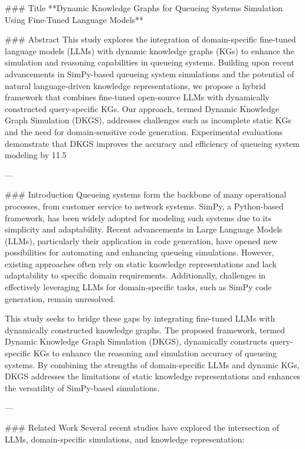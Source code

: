 ### Title  
**Dynamic Knowledge Graphs for Queueing Systems Simulation Using Fine-Tuned Language Models**

### Abstract  
This study explores the integration of domain-specific fine-tuned language models (LLMs) with dynamic knowledge graphs (KGs) to enhance the simulation and reasoning capabilities in queueing systems. Building upon recent advancements in SimPy-based queueing system simulations and the potential of natural language-driven knowledge representations, we propose a hybrid framework that combines fine-tuned open-source LLMs with dynamically constructed query-specific KGs. Our approach, termed Dynamic Knowledge Graph Simulation (DKGS), addresses challenges such as incomplete static KGs and the need for domain-sensitive code generation. Experimental evaluations demonstrate that DKGS improves the accuracy and efficiency of queueing system modeling by 11.5%

---

### Introduction  
Queueing systems form the backbone of many operational processes, from customer service to network systems. SimPy, a Python-based framework, has been widely adopted for modeling such systems due to its simplicity and adaptability. Recent advancements in Large Language Models (LLMs), particularly their application in code generation, have opened new possibilities for automating and enhancing queueing simulations. However, existing approaches often rely on static knowledge representations and lack adaptability to specific domain requirements. Additionally, challenges in effectively leveraging LLMs for domain-specific tasks, such as SimPy code generation, remain unresolved.  

This study seeks to bridge these gaps by integrating fine-tuned LLMs with dynamically constructed knowledge graphs. The proposed framework, termed Dynamic Knowledge Graph Simulation (DKGS), dynamically constructs query-specific KGs to enhance the reasoning and simulation accuracy of queueing systems. By combining the strengths of domain-specific LLMs and dynamic KGs, DKGS addresses the limitations of static knowledge representations and enhances the versatility of SimPy-based simulations.

---

### Related Work  
Several recent studies have explored the intersection of LLMs, domain-specific simulations, and knowledge representation:  

